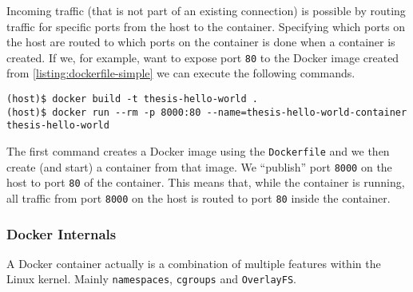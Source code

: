\hfill

Incoming traffic (that is not part of an existing connection) is possible by routing traffic for specific ports from the host to the container.
Specifying which ports on the host are routed to which ports on the container is done when a container is created. If we, for example, want to expose port \lstinline{80} to the Docker image created from \autoref{listing:dockerfile-simple} we can execute the following commands.

\begin{lstlisting}[caption={Creating a Docker container with exposed port.},label={listing:docker-port},captionpos=b]
(host)$ docker build -t thesis-hello-world .
(host)$ docker run --rm -p 8000:80 --name=thesis-hello-world-container thesis-hello-world
\end{lstlisting}

The first command creates a Docker image using the \lstinline{Dockerfile} and we then create (and start) a container from that image. We ``publish'' port \lstinline{8000} on the host to port \lstinline{80} of the container. This means that, while the container is running, all traffic from port \lstinline{8000} on the host is routed to port \lstinline{80} inside the container.

\subsubsection{Docker Internals}\label{subsubsection:internals}
A Docker container actually is a combination of multiple features within the Linux kernel.
Mainly \lstinline{namespaces}, \lstinline{cgroups} and \lstinline{OverlayFS}.

\hfill

